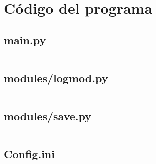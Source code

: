 \chapter{Código del programa}
\newcommand{\ipm}[1]{
	\section{#1}
	\label{#1}
	\vspace*{20pt}
	\inputminted[baselinestretch=1,
	fontsize=\scriptsize,
	linenos,
	breaklines
	]{python3}{Codigo/invproy/#1}
	\newpage{}
}

\ipm{main.py}
\ipm{modules/logmod.py}
\ipm{modules/save.py}
\ipm{Config.ini}

